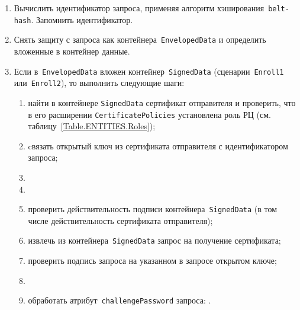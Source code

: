 \begin{enumerate}
\item
Вычислить идентификатор запроса, применяя 
алгоритм хэширования~\texttt{belt-hash}. 
Запомнить идентификатор.

\item
Снять защиту с запроса как контейнера~\texttt{EnvelopedData} 
и определить вложенные в контейнер данные.

\item
Если в~\texttt{EnvelopedData} вложен контейнер~\texttt{SignedData}
(сценарии~\texttt{Enroll1} или~\texttt{Enroll2}), 
то выполнить следующие шаги:

\begin{enumerate}
\item
найти в контейнере \texttt{SignedData} сертификат отправителя
и проверить, что в его расширении \texttt{CertificatePolicies} 
установлена роль РЦ (см. таблицу~\ref{Table.ENTITIES.Roles});
\item
cвязать открытый ключ из сертификата отправителя с идентификатором 
запроса;
\item                                                    
{}
\item                                                    
{}
\item
проверить действительность подписи контейнера~\texttt{SignedData}
(в том числе действительность сертификата отправителя);
\item
извлечь из контейнера~\texttt{SignedData} запрос на получение сертификата;
\item
проверить подпись запроса на указанном в запросе открытом ключе;
\item
{}
\item
обработать атрибут~\texttt{challengePassword} запроса:
.
\end{enumerate}


\end{enumerate}
